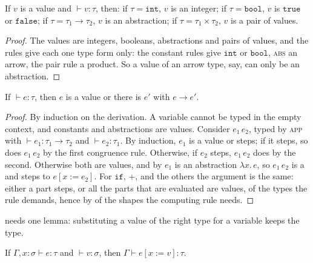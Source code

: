 \begin{lemma}\label{lem:b3:type-systems:canonical}
If $v$ is a value and $\vdash v : \tau$, then: if $\tau = \mathtt{int}$, $v$ is an integer; if $\tau = \mathtt{bool}$, $v$ is $\mathtt{true}$ or $\mathtt{false}$; if $\tau = \tau_1 \to \tau_2$, $v$ is an abstraction; if $\tau = \tau_1 \times \tau_2$, $v$ is a pair of values.
\end{lemma}

\begin{proof}
The values are integers, booleans, abstractions and pairs of values, and the rules give each one type form only: the constant rules give $\mathtt{int}$ or $\mathtt{bool}$, \textsc{abs} an arrow, the pair rule a product. So a value of an arrow type, say, can only be an abstraction.
\end{proof}

\begin{theorem}[Progress]\label{thm:b3:type-systems:progress}
If $\vdash e : \tau$, then $e$ is a value or there is $e'$ with $e \to e'$.
\end{theorem}

\begin{proof}
By induction on the derivation. A variable cannot be typed in the empty context, and constants and abstractions are values. Consider $e_1\,e_2$, typed by \textsc{app} with $\vdash e_1 : \tau_1 \to \tau_2$ and $\vdash e_2 : \tau_1$. By induction, $e_1$ is a value or steps; if it steps, so does $e_1\,e_2$ by the first congruence rule. Otherwise, if $e_2$ steps, $e_1\,e_2$ does by the second. Otherwise both are values, and by  $e_1$ is an abstraction $\lambda x.\,e$, so $e_1\,e_2$ is a  and steps to $e[x := e_2]$. For $\mathtt{if}$, $+$,  and the others the argument is the same: either a part steps, or all the parts that are evaluated are values, of the types the rule demands, hence by  of the shapes the computing rule needs.
\end{proof}

 needs one lemma: substituting a value of the right type for a variable keeps the type.

\begin{lemma}[Substitution]\label{lem:b3:type-systems:substitution}
If $\Gamma, x : \sigma \vdash e : \tau$ and $\vdash v : \sigma$, then $\Gamma \vdash e[x := v] : \tau$.
\end{lemma}

